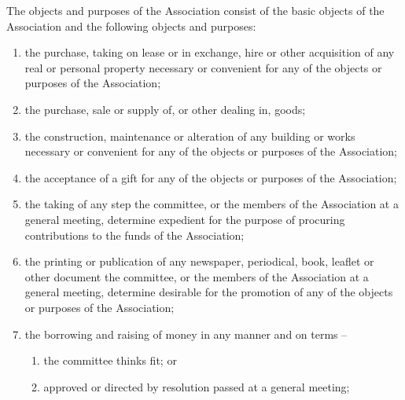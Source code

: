 \documentclass[a4paper,11pt]{article}
\begin{document}
The objects and purposes of the Association consist of the basic objects of the Association and the following objects and purposes:
\begin{enumerate}
	\item the purchase, taking on lease or in exchange, hire or other acquisition of any real or personal property necessary or convenient for any of the objects or purposes of the Association;
	\item the purchase, sale or supply of, or other dealing in, goods;
	\item the construction, maintenance or alteration of any building or works necessary or convenient for any of the objects or purposes of the Association;
	\item the acceptance of a gift for any of the objects or purposes of the Association;
	\item the taking of any step the committee, or the members of the Association at a general meeting, determine expedient for the purpose of procuring contributions to the funds of the Association;
	\item the printing or publication of any newspaper, periodical, book, leaflet or other document the committee, or the members of the Association at a general meeting, determine desirable for the promotion of any of the objects or purposes of the Association;
	
	\item the borrowing and raising of money in any manner and on terms --
	\begin{enumerate}
		\item the committee thinks fit; or
		\item approved or directed by resolution passed at a general meeting;
	\end{enumerate}
	

\end{enumerate}
\end{document}
